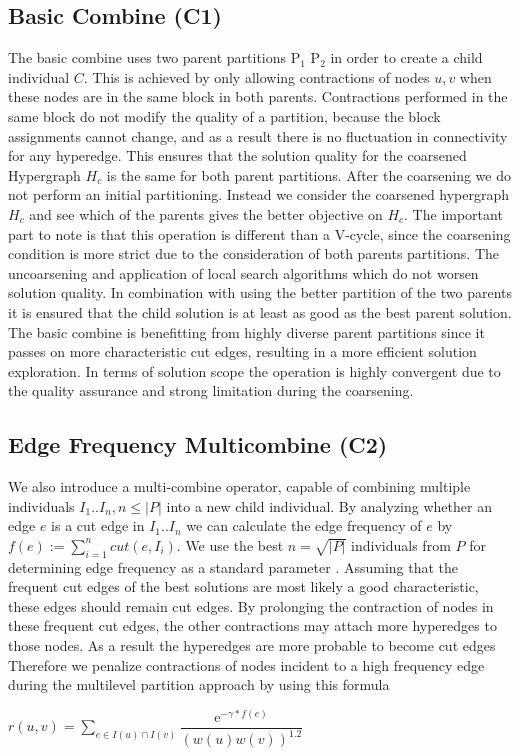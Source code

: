 \documentclass[a4paper,12pt,titlepage, BCOR7mm,headsepline]{scrbook}
\numberwithin{equation}{section}
\begin{document}
\subsection{Basic Combine (C1)}
\label{sec:basiccombine}
The basic combine uses two parent partitions P$_1$ P$_2$ in order to create a child individual $C$. This is achieved by only allowing contractions of nodes $u, v$ when these nodes are in the same block in both parents. Contractions performed in the same block do not modify the quality of a partition, because the block assignments cannot change, and as a result there is no fluctuation in connectivity for any hyperedge.
This ensures that the solution quality for the coarsened Hypergraph $H_c$ is the same for both parent partitions.  
After the coarsening we do not perform an initial partitioning. Instead we consider the coarsened hypergraph $H_c$ and see which of the parents gives the better objective on $H_c$.
The important part to note is that this operation is different than a V-cycle, since the coarsening condition is more strict due to the consideration of both parents partitions. The uncoarsening and application of local search algorithms which do not worsen solution quality. In combination with using the better partition of the two parents it is ensured that the child solution is at least as good as the best parent solution. \label{qualityassurance} The basic combine is benefitting from highly diverse parent partitions since it passes on more characteristic cut edges, resulting in a more efficient solution exploration. In terms of solution scope the operation is highly convergent due to the quality assurance and strong limitation during the coarsening. 


\subsection{Edge Frequency Multicombine (C2)}
\label{sec:edgefrequency}
We also introduce a multi-combine operator, capable of combining multiple individuals $I_1.. I_n, n \le |P|$ into a new child individual. By analyzing whether an edge $e$ is a cut edge in $I_1 ..I_n$ we can calculate the edge frequency \cite{wichlund1998multilevel} of $e$ by $f(e) := \sum_{i=1}^n cut(e,I_i)$. We use the best $n = \sqrt{|P|}$ individuals from $P$ for determining edge frequency as a standard parameter \cite{delling2011graph}. 
Assuming that the frequent cut edges of the best solutions are most likely a good characteristic, these edges should remain cut edges. By prolonging the contraction of nodes in these frequent cut edges, the other contractions may attach more hyperedges to those nodes. As a result the hyperedges are more probable to become cut edges
 Therefore we penalize contractions of nodes incident to a high frequency edge during the multilevel partition approach by using this formula
\begin{center}
$r(u,v) = \sum_{e \in I(u) \cap I(v)}\dfrac{\mathrm{e}^{-\gamma*f(e)}}{(w(u)w(v))^{1.2}}$ 
\end{center}
\end{document}
